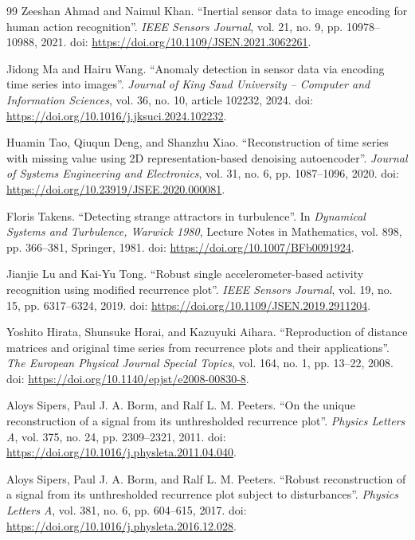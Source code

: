 \documentclass[5p]{elsarticle}
\begin{document}
\begin{thebibliography}{99}
Zeeshan Ahmad and Naimul Khan. ``Inertial sensor data to image encoding for human action recognition''. \textit{IEEE Sensors Journal}, vol. 21, no. 9, pp. 10978--10988, 2021. doi: \url{https://doi.org/10.1109/JSEN.2021.3062261}.

Jidong Ma and Hairu Wang. ``Anomaly detection in sensor data via encoding time series into images''. \textit{Journal of King Saud University -- Computer and Information Sciences}, vol. 36, no. 10, article 102232, 2024. doi: \url{https://doi.org/10.1016/j.jksuci.2024.102232}.

Huamin Tao, Qiuqun Deng, and Shanzhu Xiao. ``Reconstruction of time series with missing value using 2D representation-based denoising autoencoder''. \textit{Journal of Systems Engineering and Electronics}, vol. 31, no. 6, pp. 1087--1096, 2020. doi: \url{https://doi.org/10.23919/JSEE.2020.000081}.

Floris Takens. ``Detecting strange attractors in turbulence''. In \textit{Dynamical Systems and Turbulence, Warwick 1980}, Lecture Notes in Mathematics, vol. 898, pp. 366--381, Springer, 1981. doi: \url{https://doi.org/10.1007/BFb0091924}.

Jianjie Lu and Kai-Yu Tong. ``Robust single accelerometer-based activity recognition using modified recurrence plot''. \textit{IEEE Sensors Journal}, vol. 19, no. 15, pp. 6317--6324, 2019. doi: \url{https://doi.org/10.1109/JSEN.2019.2911204}.

Yoshito Hirata, Shunsuke Horai, and Kazuyuki Aihara. ``Reproduction of distance matrices and original time series from recurrence plots and their applications''. \textit{The European Physical Journal Special Topics}, vol. 164, no. 1, pp. 13--22, 2008. doi: \url{https://doi.org/10.1140/epjst/e2008-00830-8}.

Aloys Sipers, Paul J. A. Borm, and Ralf L. M. Peeters. ``On the unique reconstruction of a signal from its unthresholded recurrence plot''. \textit{Physics Letters A}, vol. 375, no. 24, pp. 2309--2321, 2011. doi: \url{https://doi.org/10.1016/j.physleta.2011.04.040}.

Aloys Sipers, Paul J. A. Borm, and Ralf L. M. Peeters. ``Robust reconstruction of a signal from its unthresholded recurrence plot subject to disturbances''. \textit{Physics Letters A}, vol. 381, no. 6, pp. 604--615, 2017. doi: \url{https://doi.org/10.1016/j.physleta.2016.12.028}.


\end{thebibliography}
\end{document}
